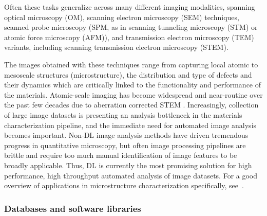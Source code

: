 \documentclass[pdflatex,sn-mathphys]{sn-jnl}%
\theoremstyle{thmstyleone}%
\theoremstyle{thmstyletwo}%
\theoremstyle{thmstylethree}%
\begin{document}
Often these tasks generalize across many different imaging modalities, spanning optical microscopy (OM), scanning electron microscopy (SEM) techniques, scanned probe microscopy (SPM, as in scanning tunneling microscopy (STM) or atomic force microscopy (AFM)), and transmission electron microscopy (TEM) variants, including scanning transmission electron microscopy (STEM).

The images obtained with these techniques range from capturing local atomic to mesoscale structures (microstructure), the distribution and type of defects and their dynamics which are critically linked to the functionality and performance of the materials.
Atomic-scale imaging has become widespread and near-routine over the past few decades  due to aberration corrected STEM \cite{Varela2005}.
Increasingly, collection of large image datasets is presenting an analysis bottleneck in the materials characterization pipeline, and the immediate need for automated image analysis becomes important. 
Non-DL image analysis methods have driven tremendous progress in quantitative microscopy, but often image processing pipelines are brittle and require too much manual identification of image features to be broadly applicable. Thus, DL is currently the most promising solution for high performance, high throughput automated analysis of image datasets.
For a good overview of applications in microstructure characterization specifically, see~\cite{Holm2020overview}.

\subsubsection{Databases and software libraries}
\end{document}

